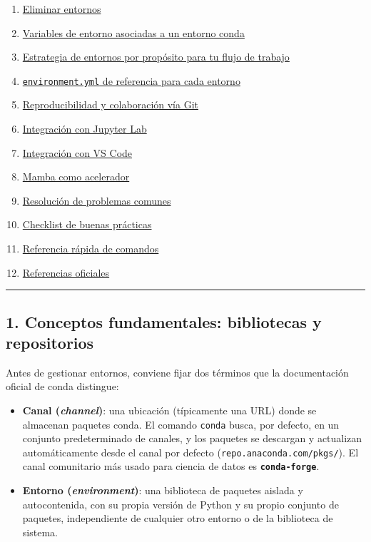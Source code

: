 \documentclass[
  doc,
  floatsintext,
  longtable,
  a4paper,
  nolmodern,
  notxfonts,
  notimes,
  12pt,
  colorlinks=true,linkcolor=blue,citecolor=blue,urlcolor=blue]{apa7}
\providecommand{\tightlist}{%
  \setlength{\itemsep}{0pt}\setlength{\parskip}{0pt}}
\begin{document}
\begin{enumerate}
{  un entorno a una revisión anterior}
\item
  \hyperref[19-eliminar-entornos]{Eliminar entornos}
\item
  \hyperref[20-variables-de-entorno-asociadas-a-un-entorno-conda]{Variables
  de entorno asociadas a un entorno conda}
\item
  \hyperref[21-estrategia-de-entornos-por-propuxf3sito-para-tu-flujo-de-trabajo]{Estrategia
  de entornos por propósito para tu flujo de trabajo}
\item
  \hyperref[22-environmentyml-de-referencia-para-cada-entorno]{\texttt{environment.yml}
  de referencia para cada entorno}
\item
  \hyperref[23-reproducibilidad-y-colaboraciuxf3n-vuxeda-git]{Reproducibilidad
  y colaboración vía Git}
\item
  \hyperref[24-integraciuxf3n-con-jupyter-lab]{Integración con Jupyter
  Lab}
\item
  \hyperref[25-integraciuxf3n-con-vs-code]{Integración con VS Code}
\item
  \hyperref[26-mamba-como-acelerador]{Mamba como acelerador}
\item
  \hyperref[27-resoluciuxf3n-de-problemas-comunes]{Resolución de
  problemas comunes}
\item
  \hyperref[28-checklist-de-buenas-pruxe1cticas]{Checklist de buenas
  prácticas}
\item
  \hyperref[29-referencia-ruxe1pida-de-comandos]{Referencia rápida de
  comandos}
\item
  \hyperref[30-referencias-oficiales]{Referencias oficiales}
\end{enumerate}

\begin{center}\rule{0.5\linewidth}{0.5pt}\end{center}

\subsection{1. Conceptos fundamentales: bibliotecas y
repositorios}\label{conceptos-fundamentales-bibliotecas-y-repositorios}

Antes de gestionar entornos, conviene fijar dos términos que la
documentación oficial de conda distingue:

\begin{itemize}
\tightlist
\item
  \textbf{Canal (\emph{channel})}: una ubicación (típicamente una URL)
  donde se almacenan paquetes conda. El comando \texttt{conda} busca,
  por defecto, en un conjunto predeterminado de canales, y los paquetes
  se descargan y actualizan automáticamente desde el canal por defecto
  (\texttt{repo.anaconda.com/pkgs/}). El canal comunitario más usado
  para ciencia de datos es \textbf{\texttt{conda-forge}}.
\item
  \textbf{Entorno (\emph{environment})}: una biblioteca de paquetes
  aislada y autocontenida, con su propia versión de Python y su propio
  conjunto de paquetes, independiente de cualquier otro entorno o de la
  biblioteca de sistema.
\end{itemize}
\end{document}
